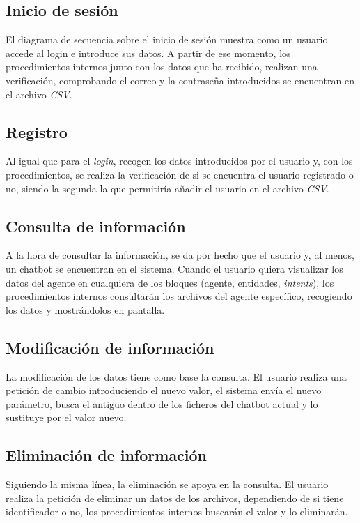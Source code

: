 \subsection{Inicio de sesión}
El diagrama de secuencia sobre el inicio de sesión muestra como un usuario accede al login e introduce sus datos. A partir de ese momento, los procedimientos internos junto con los datos que ha recibido, realizan una verificación, comprobando el correo y la contraseña introducidos se encuentran en el archivo \textit{CSV}.

\subsection{Registro}
Al igual que para el \textit{login}, recogen los datos introducidos por el usuario y, con los procedimientos, se realiza la verificación de si se encuentra el usuario registrado o no, siendo la segunda la que permitiría añadir el usuario en el archivo \textit{CSV}.

\subsection{Consulta de información}
A la hora de consultar la información, se da por hecho que el usuario y, al menos, un chatbot se encuentran en el sistema. Cuando el usuario quiera visualizar los datos del agente en cualquiera de los bloques (agente, entidades, \textit{intents}), los procedimientos internos consultarán los archivos del agente específico, recogiendo los datos y mostrándolos en pantalla.

\subsection{Modificación de información}
La modificación de los datos tiene como base la consulta. El usuario realiza una petición de cambio introduciendo el nuevo valor, el sistema envía el nuevo parámetro, busca el antiguo dentro de los ficheros del chatbot actual y lo sustituye por el valor nuevo.

\subsection{Eliminación de información}
Siguiendo la misma línea, la eliminación se apoya en la consulta. El usuario realiza la petición de eliminar un datos de los archivos, dependiendo de si tiene identificador o no, los procedimientos internos buscarán el valor y lo eliminarán.

